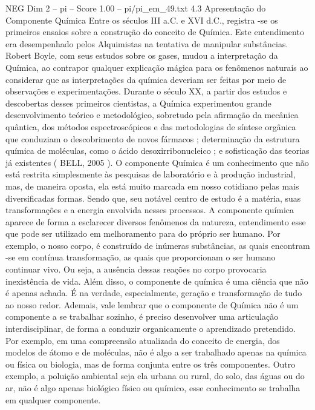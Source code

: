 \begin{textsample}{NEG Dim 2 – pi – Score 1.00 – pi/pi\_em\_49.txt}  \label{ex:f2_neg_193}
4.3 Apresentação do Componente Química Entre os séculos III a.C. e XVI d.C., registra -se os primeiros ensaios sobre a construção do conceito de Química.
Este entendimento era desempenhado pelos Alquimistas na tentativa de manipular substâncias.
Robert Boyle, com seus estudos sobre os gases, mudou a interpretação da Química, ao contrapor qualquer explicação mágica para os fenômenos naturais ao considerar que as interpretações da química deveriam ser feitas por meio de observações e experimentações.
Durante o século XX, a partir dos estudos e descobertas desses primeiros cientistas, a Química experimentou grande desenvolvimento teórico e metodológico, sobretudo pela afirmação da mecânica quântica, dos métodos espectroscópicos e das metodologias de síntese orgânica que conduziam o descobrimento de novos fármacos ; determinação da estrutura química de moléculas, como o ácido desoxirribonucleico ; e sofisticação das teorias já existentes ( BELL, 2005 ).
O componente Química é um conhecimento que não está restrita simplesmente às pesquisas de laboratório e à produção industrial, mas, de maneira oposta, ela está muito marcada em nosso cotidiano pelas mais diversificadas formas.
Sendo que, seu notável centro de estudo é a matéria, suas transformações e a energia envolvida nesses processos.
A componente química aparece de forma a esclarecer diversos fenômenos da natureza, entendimento esse que pode ser utilizado em melhoramento para do próprio ser humano.
Por exemplo, o nosso corpo, é construído de inúmeras substâncias, as quais encontram -se em contínua transformação, as quais que proporcionam o ser humano continuar vivo.
Ou seja, a ausência dessas reações no corpo provocaria inexistência de vida.
Além disso, o componente de química é uma ciência que não é apenas achada.
É na verdade, especialmente, geração e transformação de tudo ao nosso redor.
Ademais, vale lembrar que o componente de Química não é um componente a se trabalhar sozinho, é preciso desenvolver uma articulação interdisciplinar, de forma a conduzir organicamente o aprendizado pretendido.
Por exemplo, em uma compreensão atualizada do conceito de energia, dos modelos de átomo e de moléculas, não é algo a ser trabalhado apenas na química ou física ou biologia, mas de forma conjunta entre os três componentes.
Outro exemplo, a poluição ambiental seja ela urbana ou rural, do solo, das águas ou do ar, não é algo apenas biológico físico ou químico, esse conhecimento se trabalha em qualquer componente.

\end{textsample}
